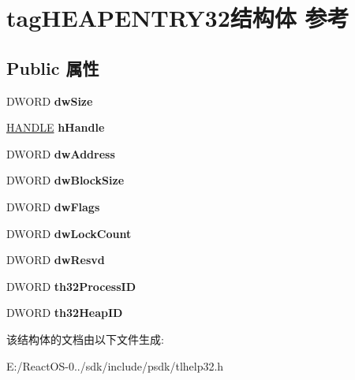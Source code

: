 \hypertarget{structtag_h_e_a_p_e_n_t_r_y32}{}\section{tag\+H\+E\+A\+P\+E\+N\+T\+R\+Y32结构体 参考}
\label{structtag_h_e_a_p_e_n_t_r_y32}
\subsection*{Public 属性}
\begin{DoxyCompactItemize}
\item 
\mbox{\label{structtag_h_e_a_p_e_n_t_r_y32_ab111b6f466ff9171e9dd0911465af4bf}} 
D\+W\+O\+RD {\bfseries dw\+Size}
\item 
\mbox{\label{structtag_h_e_a_p_e_n_t_r_y32_af6becce31542062c26ee30ef1235d516}} 
\hyperlink{interfacevoid}{H\+A\+N\+D\+LE} {\bfseries h\+Handle}
\item 
\mbox{\label{structtag_h_e_a_p_e_n_t_r_y32_a415bdd4930d40d68659d719fb9cbd118}} 
D\+W\+O\+RD {\bfseries dw\+Address}
\item 
\mbox{\label{structtag_h_e_a_p_e_n_t_r_y32_a377efb0b612e216f67f7d76f11e0f028}} 
D\+W\+O\+RD {\bfseries dw\+Block\+Size}
\item 
\mbox{\label{structtag_h_e_a_p_e_n_t_r_y32_ac942ac453b7d06fd1318be8d2daa03b3}} 
D\+W\+O\+RD {\bfseries dw\+Flags}
\item 
\mbox{\label{structtag_h_e_a_p_e_n_t_r_y32_a593f2ba83d8f20cbcb7dc4c3bc7f0e30}} 
D\+W\+O\+RD {\bfseries dw\+Lock\+Count}
\item 
\mbox{\label{structtag_h_e_a_p_e_n_t_r_y32_ab074fb5f67ad976dea011b24ac62f7c1}} 
D\+W\+O\+RD {\bfseries dw\+Resvd}
\item 
\mbox{\label{structtag_h_e_a_p_e_n_t_r_y32_a296760746f567cfec0c62f4990b9c9fe}} 
D\+W\+O\+RD {\bfseries th32\+Process\+ID}
\item 
\mbox{\label{structtag_h_e_a_p_e_n_t_r_y32_a7ada728075810077b4b1576c2d38feba}} 
D\+W\+O\+RD {\bfseries th32\+Heap\+ID}
\end{DoxyCompactItemize}


该结构体的文档由以下文件生成\+:\begin{DoxyCompactItemize}
\item 
E\+:/\+React\+O\+S-\/0../sdk/include/psdk/tlhelp32.\+h\end{DoxyCompactItemize}
